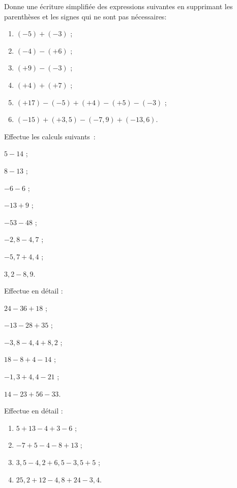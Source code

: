 \begin{exercice}
Donne une écriture simplifiée des expressions suivantes en supprimant les parenthèses et les signes qui ne sont pas nécessaires:
\begin{enumerate}
 \item $(- 5) + (- 3)$ ;
 \item $(- 4) - (+ 6)$ ;
 \item $(+ 9) - (- 3)$ ;
 \item $(+ 4) + (+ 7)$ ;
 \item $(+ 17) - (- 5) + (+ 4) - (+ 5) - (- 3)$ ;
 \item $(- 15) + (+ 3,5) - (- 7,9) + (- 13,6)$.
 \end{enumerate}
\end{exercice}


\begin{exercice}
Effectue les calculs suivants :
\begin{colenumerate}{2}
 \item $5 - 14$ ;
 \item $8 - 13$ ;
 \item $- 6 - 6$ ;
 \item $- 13 + 9$ ;
 \item $- 53 - 48$ ;
 \item $- 2,8 - 4,7$ ;
 \item $- 5,7 + 4,4$ ;
 \item $3,2 - 8,9$.
 \end{colenumerate}
\end{exercice}


\begin{exercice}
Effectue en détail :
\begin{colenumerate}{2}
 \item $24 - 36 + 18$ ;
 \item $- 13 - 28 + 35$ ;
 \item $- 3,8 - 4,4 + 8,2$ ;
 \item $18 - 8 + 4 - 14$ ;
 \item $- 1,3 + 4,4 - 21$ ;
 \item $14 - 23 + 56 - 33$.
 \end{colenumerate}
\end{exercice}


\begin{exercice}
Effectue en détail :
\begin{enumerate}
 \item $5 + 13 - 4 + 3 - 6$ ;
 \item $- 7 + 5 - 4 - 8 + 13$ ;
 \item $3,5 - 4,2 + 6,5 - 3,5 + 5$ ;
 \item $25,2 + 12 - 4,8 + 24 - 3,4$.
 \end{enumerate}
\end{exercice}


